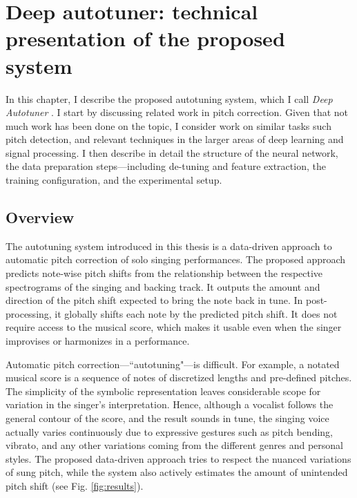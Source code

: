 \chapter{Deep autotuner: technical presentation of the proposed system}
\label{chap:thesis-autotuner}
In this chapter, I describe the proposed autotuning system, which I call \textit{Deep Autotuner} \cite{wager2020deep}. I start by discussing related work in pitch correction. Given that not much work has been done on the topic, I consider work on similar tasks such pitch detection, and relevant techniques in the larger areas of deep learning and signal processing. I then describe in detail the structure of the neural network, the data preparation steps---including de-tuning and feature extraction, the training configuration, and the experimental setup. 


\section{Overview}
The autotuning system introduced in this thesis is a data-driven approach to automatic pitch correction of solo singing performances. The proposed approach predicts note-wise pitch shifts from the relationship between the respective spectrograms of the singing and backing track. It outputs the amount and direction of the pitch shift expected to bring the note back in tune. In post-processing, it globally shifts each note by the predicted pitch shift. It does not require access to the musical score, which makes it usable even when the singer improvises or harmonizes in a performance.

Automatic pitch correction---``autotuning"---is difficult. For example, a notated musical score is a sequence of notes of discretized lengths and pre-defined pitches. The simplicity of the symbolic representation leaves considerable scope for variation in the singer's interpretation. Hence, although a vocalist follows the general contour of the score, and the result sounds in tune, the singing voice actually varies continuously due to expressive gestures such as pitch bending, vibrato, and any other variations coming from the different genres and personal styles. The proposed data-driven approach tries to respect the nuanced variations of sung pitch, while the system also actively estimates the amount of unintended pitch shift (see Fig. \ref{fig:results}).

